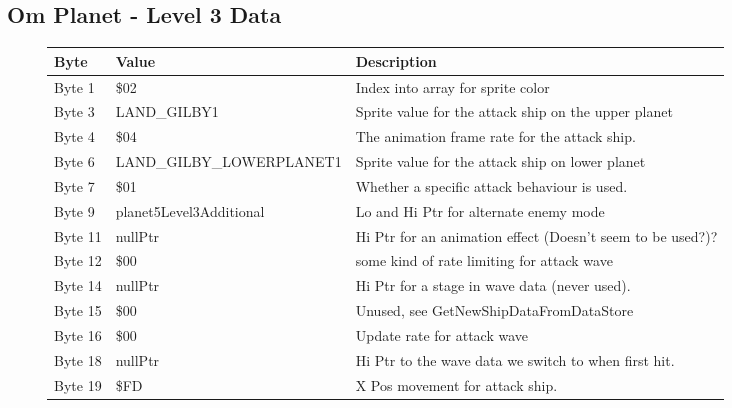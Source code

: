 \clearpage
\subsection{Om Planet - Level 3 Data}

\begin{figure}[H]
  {
  \setlength{\tabcolsep}{3.0pt}
  \setlength\cmidrulewidth{\heavyrulewidth} %
  \begin{adjustbox}{width=12cm}

\begin{tabular}{lll}
\toprule
 Byte    & Value                     & Description                                                        \\
\midrule
 Byte 1  & \$02                       & Index into array for sprite color                                  \\
 Byte 3  & LAND\_GILBY1               & Sprite value for the attack ship on the upper planet               \\
 Byte 4  & \$04                       & The animation frame rate for the attack ship.                      \\
 Byte 6  & LAND\_GILBY\_LOWERPLANET1   & Sprite value for the attack ship on lower planet                   \\
 Byte 7  & \$01                       & Whether a specific attack behaviour is used.                       \\
 Byte 9  & planet5Level3Additional   & Lo and Hi Ptr for alternate enemy mode                             \\
 Byte 11 & nullPtr                   & Hi Ptr for an animation effect (Doesn't seem to be used?)?         \\
 Byte 12 & \$00                       & some kind of rate limiting for attack wave                         \\
 Byte 14 & nullPtr                   & Hi Ptr for a stage in wave data (never used).                      \\
 Byte 15 & \$00                       & Unused, see GetNewShipDataFromDataStore                            \\
 Byte 16 & \$00                       & Update rate for attack wave                                        \\
 Byte 18 & nullPtr                   & Hi Ptr to the wave data we switch to when first hit.               \\
 Byte 19 & \$FD                       & X Pos movement for attack ship.                                    \\

\end{tabular}
\end{adjustbox}}
\end{figure}
